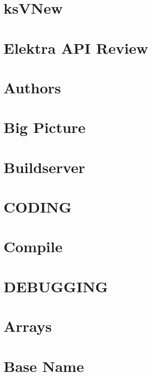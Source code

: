 \let\mypdfximage\pdfximage\def\pdfximage{\immediate\mypdfximage}\documentclass[twoside]{book}
\newcommand{\+}{\discretionary{\mbox{\scriptsize$\hookleftarrow$}}{}{}}
\begin{document}
\chapter{ks\+VNew}
\label{doc_api_review_core_ksVNew_md}

\chapter{Elektra API Review}
\label{doc_api_review_README_md}

\chapter{Authors}
\label{doc_AUTHORS_md}

\chapter{Big Picture}
\label{doc_BIGPICTURE_md}

\chapter{Buildserver}
\label{doc_BUILDSERVER_md}

\chapter{CODING}
\label{doc_CODING_md}

\chapter{Compile}
\label{doc_COMPILE_md}

\chapter{DEBUGGING}
\label{doc_DEBUGGING_md}

\chapter{Arrays}
\label{doc_decisions_array_md}

\chapter{Base Name}
\label{doc_decisions_base_name_md}

\end{document}
